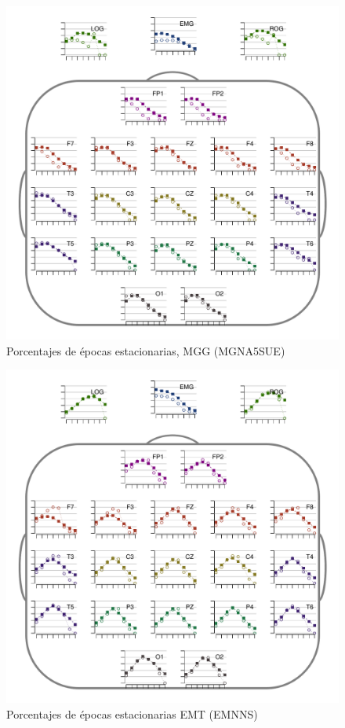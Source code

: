 \begin{figure}
\centering
\includegraphics[width=.9\linewidth]{./img_resultados/MGNA5SUE_cabeza_epocas_.pdf}
\caption{Porcentajes de épocas estacionarias, MGG (MGNA5SUE)}
\end{figure}

\begin{figure}
\centering
\includegraphics[width=.9\linewidth]{./img_resultados/EMNNS_cabeza_epocas_.pdf}
\caption{Porcentajes de épocas estacionarias EMT (EMNNS)}
\end{figure}

